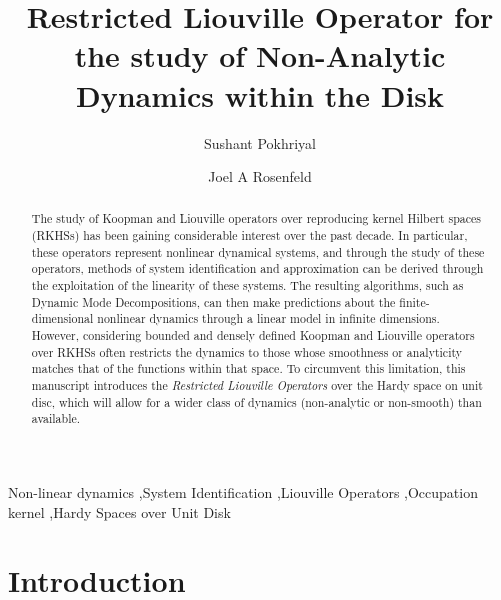 \documentclass[preprint,12pt]{elsarticle} %
\theoremstyle{plain}
\theoremstyle{definition}
\theoremstyle{remark}
\begin{document}
\begin{frontmatter}

\title{Restricted Liouville Operator for the study of Non-Analytic Dynamics within the Disk}

\author[inst1]{Sushant Pokhriyal}
\author[inst1]{Joel A Rosenfeld}
\address[inst1]{Department of Mathematics and Statistics, University of South Florida, 4202 E Fowler Avenue, Tampa, USA}

\begin{abstract}
The study of Koopman and Liouville operators over reproducing kernel Hilbert spaces (RKHSs) has been gaining considerable interest over the past decade. In particular, these operators represent nonlinear dynamical systems, and through the study of these operators, methods of system identification and approximation can be derived through the exploitation of the linearity of these systems. The resulting algorithms, such as Dynamic Mode Decompositions, can then make predictions about the finite-dimensional nonlinear dynamics through a linear model in infinite dimensions. However, considering bounded and densely defined Koopman and Liouville operators over RKHSs often restricts the dynamics to those whose smoothness or analyticity matches that of the functions within that space. To circumvent this limitation, this manuscript introduces the \textit{Restricted Liouville Operators} over the Hardy space on unit disc, which will allow for a wider class of dynamics (non-analytic or non-smooth) than available. 
\end{abstract}

\begin{keyword}
Non-linear dynamics \sep System Identification \sep Liouville Operators \sep Occupation kernel \sep Hardy Spaces over Unit Disk
\end{keyword}

\end{frontmatter}
\section{Introduction}\label{sec1}
\end{document}
